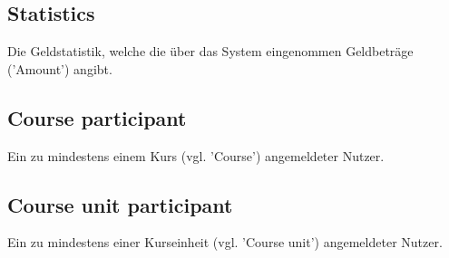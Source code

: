 \subsection{Statistics}
Die Geldstatistik, welche die über das System eingenommen Geldbeträge ('Amount') angibt.

\subsection{Course participant}
Ein zu mindestens einem Kurs (vgl. 'Course') angemeldeter Nutzer.

\subsection{Course unit participant}
Ein zu mindestens einer Kurseinheit (vgl. 'Course unit') angemeldeter Nutzer.